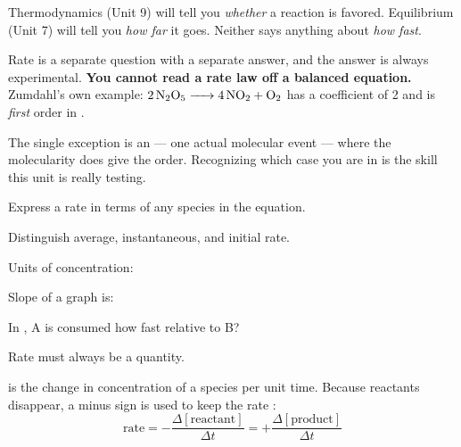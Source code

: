 \documentclass{apchem-notes}
\begin{document}
\apctitleblock

\begin{apcnote}
Thermodynamics (Unit 9) will tell you \emph{whether} a reaction is favored.
Equilibrium (Unit 7) will tell you \emph{how far} it goes. Neither says
anything about \emph{how fast}.

Rate is a separate question with a separate answer, and the answer is
always experimental. \textbf{You cannot read a rate law off a balanced
equation.} Zumdahl's own example: $\ce{2N2O5 -> 4NO2 + O2}$ has a
coefficient of 2 and is \emph{first} order in .

The single exception is an  --- one actual molecular
event --- where the molecularity does give the order. Recognizing which case
you are in is the skill this unit is really testing.
\end{apcnote}


\begin{objectives}
  \item Express a rate in terms of any species in the equation.
  \item Distinguish average, instantaneous, and initial rate.
\end{objectives}


\begin{warmup}[4]
  \item Units of concentration: 
  \item Slope of a graph is: 
  \item In , A is consumed how fast relative to B?
  \item Rate must always be a  quantity.
\end{warmup}



 is the change in concentration of a species per unit
time. Because reactants disappear, a minus sign is used to keep the rate
:
\[ \text{rate} = -\frac{\Delta[\text{reactant}]}{\Delta t}
   = +\frac{\Delta[\text{product}]}{\Delta t} \]
\end{document}
